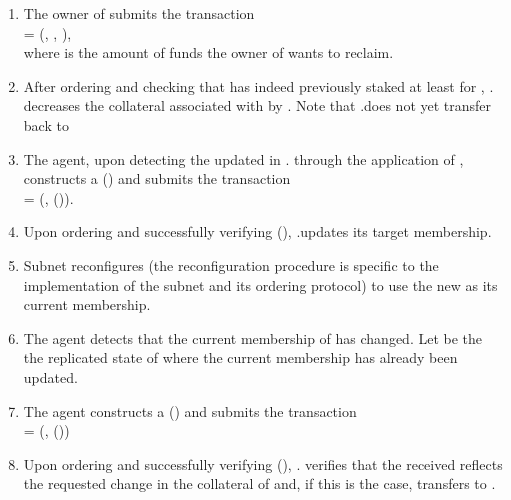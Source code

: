 \begin{enumerate}

    \item The owner of  submits the transaction\\
     = (, , ),\\
    where  is the amount of funds the owner of  wants to reclaim.

    \item After ordering  and checking that  has indeed previously staked at least  for ,
    . decreases the collateral associated with  by .
    Note that .\sa does not yet transfer  back to 

    \item The \ipc agent, upon detecting the updated  in . through the application of ,
    constructs a {\pof}() and submits the transaction\\
     = (, {\pof}()).

    \item Upon ordering  and successfully verifying {\pof}(), .\gw updates its target membership.

    \item Subnet  reconfigures (the reconfiguration procedure is specific to the implementation of the subnet and its ordering protocol)
    to use the new  as its current membership.

    \item The \ipc agent detects that the current membership of  has changed.
    Let  be the the replicated state of  where the current membership has already been updated.

    \item The \ipc agent constructs a {\pof}() and submits the transaction\\
     = (, {\pof}())

    \item Upon ordering  and successfully verifying {\pof}(),
    . verifies that the received  reflects the requested change in the collateral of 
    and, if this is the case, transfers  to .
    
\end{enumerate}

